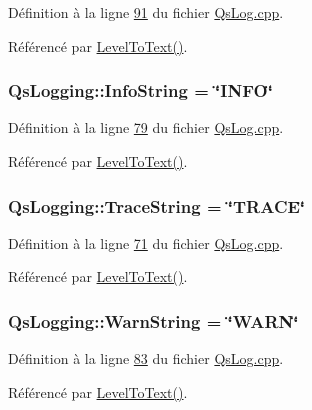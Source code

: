 Définition à la ligne \hyperlink{QsLog_8cpp_source_l00091}{91} du fichier \hyperlink{QsLog_8cpp_source}{Qs\-Log.\-cpp}.



Référencé par \hyperlink{namespaceQsLogging_a8e669585768b47ba483f7325c18d60b8}{Level\-To\-Text()}.

\hypertarget{namespaceQsLogging_a747ad47c7ca8e96d020e912573d18cd1}{
\subsubsection[{Info\-String}]{\setlength{\rightskip}{0pt plus 5cm}Qs\-Logging\-::\-Info\-String = \char`\"{}I\-N\-F\-O\char`\"{}\hspace{0.3cm}{\ttfamily [static]}}}\label{namespaceQsLogging_a747ad47c7ca8e96d020e912573d18cd1}


Définition à la ligne \hyperlink{QsLog_8cpp_source_l00079}{79} du fichier \hyperlink{QsLog_8cpp_source}{Qs\-Log.\-cpp}.



Référencé par \hyperlink{namespaceQsLogging_a8e669585768b47ba483f7325c18d60b8}{Level\-To\-Text()}.

\hypertarget{namespaceQsLogging_a8bb6a67c53ebaad64d3e58c5a5a362ee}{
\subsubsection[{Trace\-String}]{\setlength{\rightskip}{0pt plus 5cm}Qs\-Logging\-::\-Trace\-String = \char`\"{}T\-R\-A\-C\-E\char`\"{}\hspace{0.3cm}{\ttfamily [static]}}}\label{namespaceQsLogging_a8bb6a67c53ebaad64d3e58c5a5a362ee}


Définition à la ligne \hyperlink{QsLog_8cpp_source_l00071}{71} du fichier \hyperlink{QsLog_8cpp_source}{Qs\-Log.\-cpp}.



Référencé par \hyperlink{namespaceQsLogging_a8e669585768b47ba483f7325c18d60b8}{Level\-To\-Text()}.

\hypertarget{namespaceQsLogging_a448066a966f37903f05c519ceb33814f}{
\subsubsection[{Warn\-String}]{\setlength{\rightskip}{0pt plus 5cm}Qs\-Logging\-::\-Warn\-String = \char`\"{}W\-A\-R\-N\char`\"{}\hspace{0.3cm}{\ttfamily [static]}}}\label{namespaceQsLogging_a448066a966f37903f05c519ceb33814f}


Définition à la ligne \hyperlink{QsLog_8cpp_source_l00083}{83} du fichier \hyperlink{QsLog_8cpp_source}{Qs\-Log.\-cpp}.



Référencé par \hyperlink{namespaceQsLogging_a8e669585768b47ba483f7325c18d60b8}{Level\-To\-Text()}.

